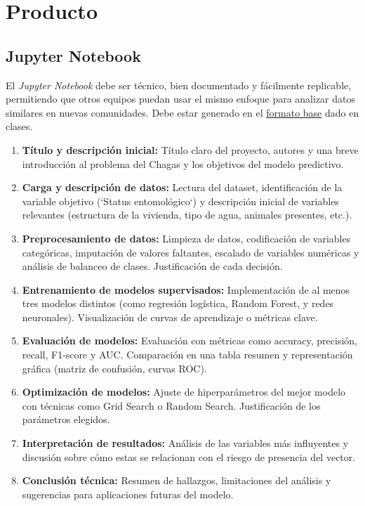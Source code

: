 \documentclass[a4,11pt]{aleph-notas}
\begin{document}
\section*{Producto}

\subsection{Jupyter Notebook}
El \textit{Jupyter Notebook} debe ser técnico, bien documentado y fácilmente replicable, permitiendo que otros equipos puedan usar el mismo enfoque para analizar datos similares en nuevas comunidades. Debe estar generado en el \href{https://github.com/andres-merino/FormatoBaseProyectos/blob/main/Plantilla.ipynb}{formato base} dado en clases.

\begin{enumerate}[leftmargin=*, label={\textbf{\arabic*.}}]
    \item \textbf{Título y descripción inicial:} Título claro del proyecto, autores y una breve introducción al problema del Chagas y los objetivos del modelo predictivo.

    \item \textbf{Carga y descripción de datos:} Lectura del dataset, identificación de la variable objetivo (`Status entomológico`) y descripción inicial de variables relevantes (estructura de la vivienda, tipo de agua, animales presentes, etc.).

    \item \textbf{Preprocesamiento de datos:} Limpieza de datos, codificación de variables categóricas, imputación de valores faltantes, escalado de variables numéricas y análisis de balanceo de clases. Justificación de cada decisión.

    \item \textbf{Entrenamiento de modelos supervisados:} Implementación de al menos tres modelos distintos (como regresión logística, Random Forest, y redes neuronales). Visualización de curvas de aprendizaje o métricas clave.

    \item \textbf{Evaluación de modelos:} Evaluación con métricas como accuracy, precisión, recall, F1-score y AUC. Comparación en una tabla resumen y representación gráfica (matriz de confusión, curvas ROC).

    \item \textbf{Optimización de modelos:} Ajuste de hiperparámetros del mejor modelo con técnicas como Grid Search o Random Search. Justificación de los parámetros elegidos.

    \item \textbf{Interpretación de resultados:} Análisis de las variables más influyentes y discusión sobre cómo estas se relacionan con el riesgo de presencia del vector.

    \item \textbf{Conclusión técnica:} Resumen de hallazgos, limitaciones del análisis y sugerencias para aplicaciones futuras del modelo.
\end{enumerate}
\end{document}
